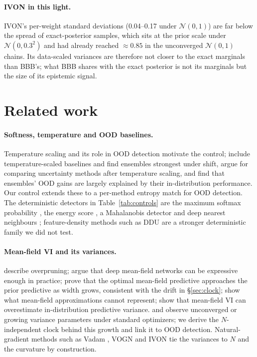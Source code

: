 \documentclass[10pt]{article}
\begin{document}
\paragraph{IVON in this light.} IVON's per-weight standard deviations
(0.04--0.17 under $\mathcal N(0,1)$) are far below the spread of exact-posterior
samples, which sits at the prior scale under $\mathcal N(0,0.3^2)$ and had
already reached $\approx0.85$ in the unconverged $\mathcal N(0,1)$ chains. Its
data-scaled variances are therefore not closer to the exact marginals than
BBB's; what BBB shares with the exact posterior is not its marginals but the
size of its epistemic signal.

\section{Related work}
\paragraph{Softness, temperature and OOD baselines.} Temperature scaling
\citep{guo2017calibration} and its role in OOD detection
\citep{liang2018enhancing} motivate the control; \citet{ovadia2019can} include
temperature-scaled baselines and find ensembles strongest under shift,
\citet{ashukha2020pitfalls} argue for comparing uncertainty methods after
temperature scaling, and \citet{abe2022deep} find that ensembles' OOD gains are
largely explained by their in-distribution performance. Our control extends
these to a per-method entropy match for OOD detection. The deterministic
detectors in Table~\ref{tab:controls} are the maximum softmax probability
\citep{hendrycks2017baseline}, the energy score \citep{liu2020energy}, a
Mahalanobis detector \citep{lee2018simple} and deep nearest neighbours
\citep{sun2022knn}; feature-density methods such as DDU
\citep{mukhoti2023ddu} are a stronger deterministic family we did not test.

\paragraph{Mean-field VI and its variances.} \citet{trippe2018overpruning}
describe overpruning; \citet{farquhar2020liberty} argue that deep mean-field
networks can be expressive enough in practice; \citet{coker2022wide} prove that the optimal mean-field
predictive approaches the prior predictive as width grows, consistent with
the drift in \S\ref{sec:clock}; \citet{foong2020expressiveness} show what
mean-field approximations cannot represent; \citet{odgers2026gaussian} show
that mean-field VI can overestimate in-distribution predictive variance.
\citet{unlu2020variational} and \citet{nishida2022adamb} observe unconverged or
growing variance parameters under standard optimizers; we derive the
$N$-independent clock behind this growth and link it to OOD detection.
Natural-gradient methods such as Vadam \citep{khan2018fast}, VOGN
\citep{osawa2019practical} and IVON
\citep{shen2024variational} tie the variances to $N$ and the curvature by
construction.
\end{document}
